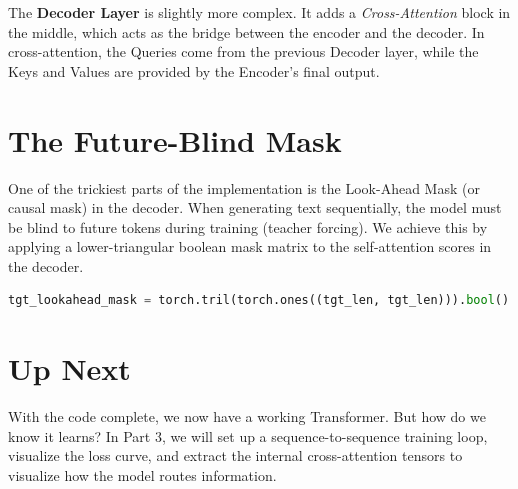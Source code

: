 \documentclass[12pt]{article}
\begin{document}
The \textbf{Decoder Layer} is slightly more complex. It adds a \textit{Cross-Attention} block in the middle, which acts as the bridge between the encoder and the decoder. In cross-attention, the Queries come from the previous Decoder layer, while the Keys and Values are provided by the Encoder's final output.

\section{The Future-Blind Mask}
One of the trickiest parts of the implementation is the Look-Ahead Mask (or causal mask) in the decoder. When generating text sequentially, the model must be blind to future tokens during training (teacher forcing). We achieve this by applying a lower-triangular boolean mask matrix to the self-attention scores in the decoder.

\begin{lstlisting}[language=Python]
tgt_lookahead_mask = torch.tril(torch.ones((tgt_len, tgt_len))).bool()
\end{lstlisting}

\section{Up Next}
With the code complete, we now have a working Transformer. But how do we know it learns? In Part 3, we will set up a sequence-to-sequence training loop, visualize the loss curve, and extract the internal cross-attention tensors to visualize how the model routes information.
\end{document}
